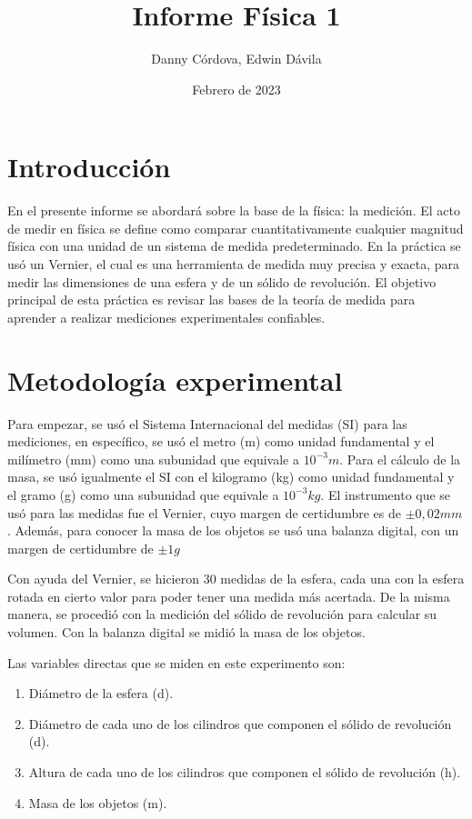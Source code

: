 \documentclass[a4paper]{article}
\title{Informe Física 1}
\author{Danny Córdova, Edwin Dávila}
\date{Febrero de 2023}
\begin{document}
\maketitle

\section{Introducción}
En el presente informe se abordará sobre la base de la física: la medición. El acto de medir en física se define como comparar cuantitativamente cualquier magnitud física con una unidad de un sistema de medida predeterminado. En la práctica se usó un Vernier, el cual es una herramienta de medida muy precisa y exacta, para medir las dimensiones de una esfera y de un sólido de revolución. El objetivo principal de esta práctica es revisar las bases de la teoría de medida para aprender a realizar mediciones experimentales confiables. 

\section{Metodología experimental}
Para empezar, se usó el Sistema Internacional del medidas (SI) para las mediciones, en específico, se usó el metro (m) como unidad fundamental y el milímetro (mm) como una subunidad que equivale a $10^{-3}m$. Para el cálculo de la masa, se usó igualmente el SI con el kilogramo (kg) como unidad fundamental y el gramo (g) como una subunidad que equivale a $10^{-3}kg$.  El instrumento que se usó para las medidas fue el Vernier, cuyo margen de certidumbre es de $\pm0,02 mm$. Además, para conocer la masa de los objetos se usó una balanza digital, con un margen de certidumbre de $\pm1 g$

Con ayuda del Vernier, se hicieron 30 medidas de la esfera, cada una con la esfera rotada en cierto valor para poder tener una medida más acertada. De la misma manera, se procedió con la medición del sólido de revolución para calcular su volumen. Con la balanza digital se midió la masa de los objetos. 

Las variables directas que se miden en este experimento son:
\begin{enumerate}
  \item Diámetro de la esfera (d).
  \item Diámetro de cada uno de los cilindros que componen el sólido de revolución (d).
  \item Altura de cada uno de los cilindros que componen el sólido de revolución (h).
  \item Masa de los objetos (m).
\end{enumerate}
\end{document}
